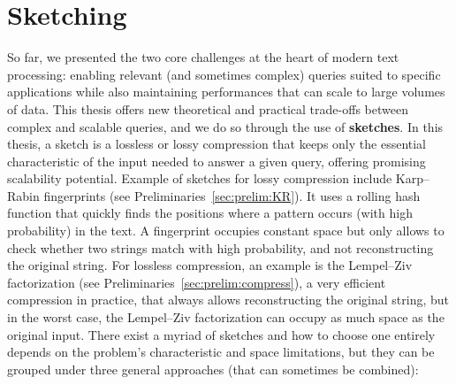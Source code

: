 \section{Sketching}\label{intro:sec:sketching}
%

So far, we presented the two core challenges at the heart of modern text processing: enabling relevant (and sometimes complex) queries suited to specific applications while also maintaining performances that can scale to large volumes of data.
%
This thesis offers new theoretical and practical trade-offs between complex and scalable queries, and we do so through the use of \textbf{sketches}.
%
In this thesis, a sketch is a lossless or lossy compression that keeps only the essential characteristic of the input needed to answer a given query, offering promising scalability potential. 
Example of sketches for lossy compression include Karp--Rabin fingerprints (see Preliminaries~\ref{sec:prelim:KR}). It uses a rolling hash function that quickly finds the positions where a pattern occurs (with high probability) in the text. A fingerprint occupies constant space but only allows to check whether two strings match with high probability, and not reconstructing the original string.
For lossless compression, an example is the Lempel--Ziv factorization (see Preliminaries~\ref{sec:prelim:compress}), a very efficient compression in practice, that always allows reconstructing the original string, but in the worst case, the Lempel--Ziv factorization can occupy as much space as the original input.
There exist a myriad of sketches and how to choose one entirely depends on the problem's characteristic and space limitations, but they can be grouped under three general approaches (that can sometimes be combined):



